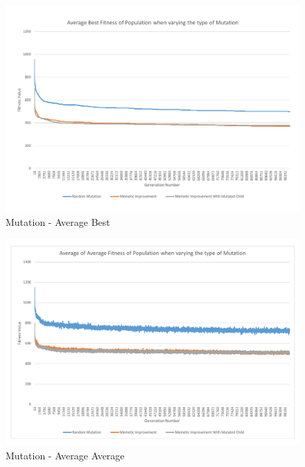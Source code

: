 \begin{figure}[thbp]
	\centerline{\includegraphics[width=\paperwidth]{figures/CircleTests/Mutation/CircleTestMutationAverageBest.pdf}}
	\caption{Mutation - Average Best}
	\label{fig:ctmab}
\end{figure}

\begin{figure}[thbp]
	\centerline{\includegraphics[width=\paperwidth]{figures/CircleTests/Mutation/CircleTestMutationAverageAverage.pdf}}
	\caption{Mutation - Average Average}
	\label{fig:ctmaa}
\end{figure}

